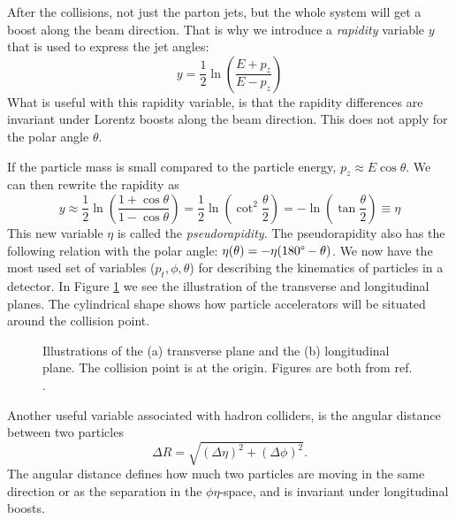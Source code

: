 \documentclass[a4paper, american, 12pt]{report}
\begin{document}
	After the collisions, not just the parton jets, but the whole system will get a boost along the beam direction. That is why we introduce a \textit{rapidity} variable $y$ that is used to express the jet angles:
	\begin{equation}
	\label{eq:Rapidity}
		y=\frac{1}{2}\ln\left(\frac{E+p_z}{E-p_z}\right)
	\end{equation}
	What is useful with this rapidity variable, is that the rapidity differences are invariant under Lorentz boosts along the beam direction. This does not apply for the polar angle $\theta$. 

	If the particle mass is small compared to the particle energy, $p_z\approx E\cos\theta$. We can then rewrite the rapidity as
	\begin{equation}
	\label{eq:Pseudorapidity}
		y\approx\frac{1}{2}\ln\left(\frac{1+\cos\theta}{1-\cos\theta}\right)=\frac{1}{2}\ln\left(\cot^2\frac{\theta}{2}\right)=-\ln\left(\tan\frac{\theta}{2}\right)\equiv\eta
	\end{equation}
	This new variable $\eta$ is called the \textit{pseudorapidity}. The pseudorapidity also has the following relation with the polar angle: $\eta(\theta)=-\eta(180\text{\textdegree}-\theta)$. We now have the most used set of variables ($p_t, \phi, \theta$) for describing the kinematics of particles in a detector. In Figure \ref{fig:Planes} we see the illustration of the transverse and longitudinal planes. The cylindrical shape shows how particle accelerators will be situated around the collision point.
	\begin{figure}[htbp!]
		\caption[Collider geometry.]{Illustrations of the (a) transverse plane and the (b) longitudinal plane. The collision point is at the origin. Figures are both from ref. \cite{gramstad2013searches}. \label{fig:Planes}}
	\end{figure} 

	Another useful variable associated with hadron colliders, is the angular distance between two particles
	\begin{equation}
	\label{eq:Angular_distance}
		\Delta R=\sqrt{(\Delta \eta)^2+(\Delta \phi)^2}.
	\end{equation}
	The angular distance defines how much two particles are moving in the same direction or as the separation in the $\phi\eta$-space, and is invariant under longitudinal boosts.
\end{document}
